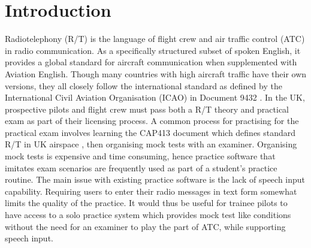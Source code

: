 \section{Introduction}
Radiotelephony (R/T) is the language of flight crew and air traffic control (ATC) in radio communication. As a specifically structured subset of spoken English, it provides a global standard for aircraft communication when supplemented with Aviation English. Though many countries with high aircraft traffic have their own versions, they all closely follow the international standard as defined by the International Civil Aviation Organisation (ICAO) in Document 9432 \cite{Doc9432}. In the UK, prospective pilots and flight crew must pass both a R/T theory and practical exam as part of their licensing process. A common process for practising for the practical exam involves learning the CAP413 document which defines standard R/T in UK airspace \cite{CAP413}, then organising mock tests with an examiner. Organising mock tests is expensive and time consuming, hence practice software that imitates exam scenarios are frequently used as part of a student's practice routine. The main issue with existing practice software is the lack of speech input capability. Requiring users to enter their radio messages in text form somewhat limits the quality of the practice. It would thus be useful for trainee pilots to have access to a solo practice system which provides mock test like conditions without the need for an examiner to play the part of ATC, while supporting speech input.